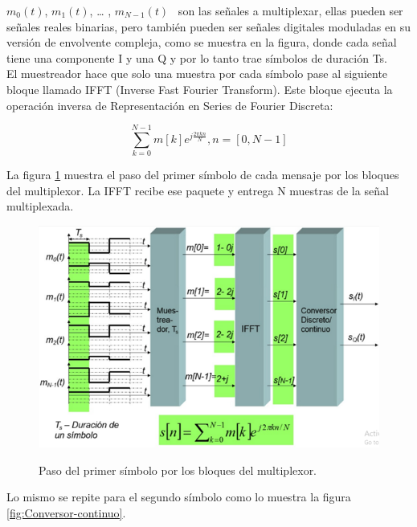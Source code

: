 $m_{0}(t)$, $m_{1}(t)$, … , $m_{N-1}(t)$  \ 
son las señales a multiplexar, ellas pueden ser señales reales binarias, pero también pueden ser señales digitales moduladas en su versión de envolvente compleja, como se muestra en la figura, donde cada señal tiene una componente I y una Q y por lo tanto trae símbolos de duración Ts. \\

El muestreador hace que solo una muestra por cada símbolo pase al siguiente bloque llamado IFFT (Inverse Fast Fourier Transform). Este bloque ejecuta la operación inversa de Representación en Series de Fourier Discreta:

\begin{equation} \label{capseis_doce}
\sum_{k=0}^{N-1}m[k]e^{j \frac{2 \pi kn}{N}} ,n=[0, N-1]
\end{equation}

La figura \ref{fig:Conversor-discreto} muestra el paso del primer símbolo de cada mensaje por los bloques del multiplexor. La IFFT recibe ese paquete y entrega N muestras de la señal multiplexada.

\vspace{200px}
\begin{figure}[h!]
	\captionsetup{justification = raggedright, singlelinecheck = false}
	\caption{Paso del primer símbolo por los bloques del multiplexor.} 
	\centering
	\includegraphics[scale=0.9]{Imagenes/Conversor-discreto.png}
	\label{fig:Conversor-discreto}
\end{figure}

Lo mismo se repite para el segundo símbolo como lo muestra la figura \ref{fig:Conversor-continuo}.

